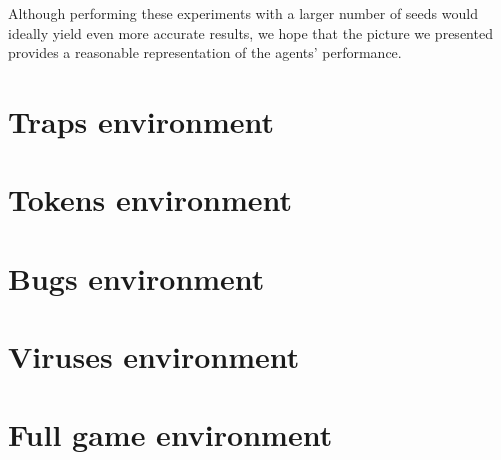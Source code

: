 Although performing these experiments with a larger number of seeds would ideally yield even more accurate results, we hope that the picture we presented provides a reasonable representation of the agents' performance.

\section{Traps environment}
\section{Tokens environment}
\section{Bugs environment}
\section{Viruses environment}
\section{Full game environment}